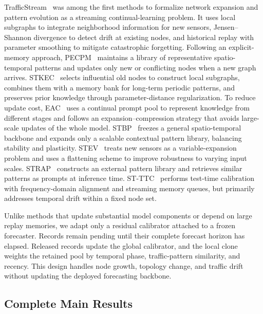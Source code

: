 TrafficStream~\cite{ijcai2021p0498} was among the first methods to formalize network expansion and pattern evolution as a streaming continual-learning problem. It uses local subgraphs to integrate neighborhood information for new sensors, Jensen--Shannon divergence to detect drift at existing nodes, and historical replay with parameter smoothing to mitigate catastrophic forgetting. Following an explicit-memory approach, PECPM~\cite{wang2023pattern} maintains a library of representative spatio-temporal patterns and updates only new or conflicting nodes when a new graph arrives. STKEC~\cite{wang2023knowledge} selects influential old nodes to construct local subgraphs, combines them with a memory bank for long-term periodic patterns, and preserves prior knowledge through parameter-distance regularization. To reduce update cost, EAC~\cite{chen2025expand} uses a continual prompt pool to represent knowledge from different stages and follows an expansion--compression strategy that avoids large-scale updates of the whole model. STBP~\cite{liugeneral} freezes a general spatio-temporal backbone and expands only a scalable contextual pattern library, balancing stability and plasticity. STEV~\cite{ma2025beyond} treats new sensors as a variable-expansion problem and uses a flattening scheme to improve robustness to varying input scales. STRAP~\cite{zhang2025strap} constructs an external pattern library and retrieves similar patterns as prompts at inference time. ST-TTC~\cite{chen2025learning} performs test-time calibration with frequency-domain alignment and streaming memory queues, but primarily addresses temporal drift within a fixed node set.

Unlike methods that update substantial model components or depend on large replay memories, we adapt only a residual calibrator attached to a frozen forecaster. Records remain pending until their complete forecast horizon has elapsed. Released records update the global calibrator, and the local clone weights the retained pool by temporal phase, traffic-pattern similarity, and recency. This design handles node growth, topology change, and traffic drift without updating the deployed forecasting backbone.




\subsection{Complete Main Results}




